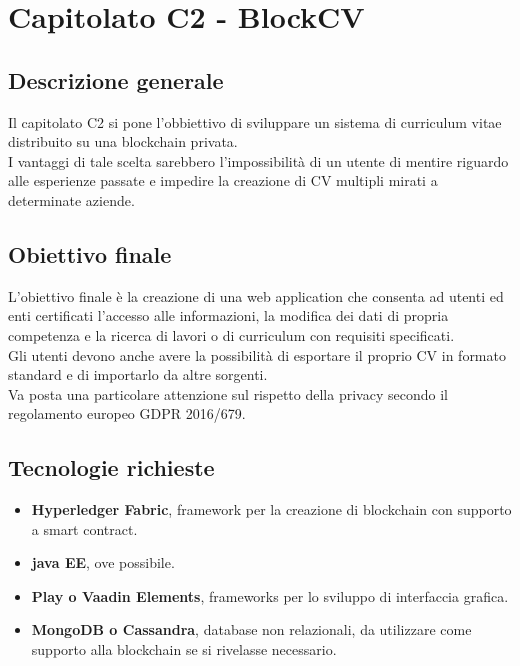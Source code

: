 \documentclass[main.tex]{subfiles}
\begin{document}
\chapter{Capitolato C2 - BlockCV}
\section{Descrizione generale}
Il capitolato C2 si pone l'obbiettivo di sviluppare un sistema di curriculum vitae distribuito su una blockchain privata.\\
I vantaggi di tale scelta sarebbero l'impossibilità di un utente di mentire riguardo alle esperienze passate e impedire la creazione di CV multipli mirati a determinate aziende.
\section{Obiettivo finale}
L'obiettivo finale è la creazione di una web application che consenta ad utenti ed enti certificati l'accesso alle informazioni, la modifica dei dati di propria competenza e la ricerca di lavori o di curriculum con requisiti specificati.\\
Gli utenti devono anche avere la possibilità di esportare il proprio CV in formato standard e di importarlo da altre sorgenti.\\
Va posta una particolare attenzione sul rispetto della privacy secondo il regolamento europeo GDPR 2016/679.
\section{Tecnologie richieste}
\begin{itemize}
	\item \textbf{Hyperledger Fabric}, framework per la creazione di blockchain con supporto a smart contract.
	\item \textbf{java EE}, ove possibile.
	\item \textbf{Play o Vaadin Elements}, frameworks per lo sviluppo di interfaccia grafica.
	\item \textbf{MongoDB o Cassandra}, database non relazionali, da utilizzare come supporto alla blockchain se si rivelasse necessario.
\end{itemize}
\end{document}

